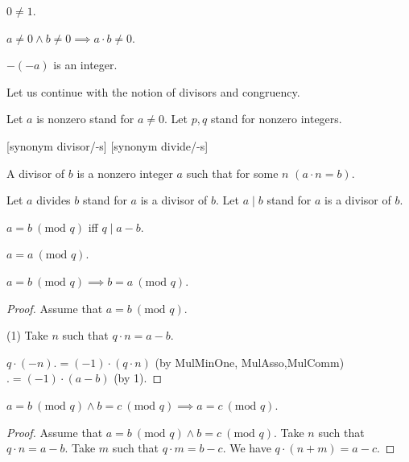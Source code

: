 \documentclass{article}
\renewcommand{\mod}{\text{mod }}
\begin{document}
  \begin{forthel}
    \begin{axiom}[NonTriv]
      $0 \neq 1$.
    \end{axiom}

    \begin{axiom}[ZeroDiv]
      $a \neq 0 \wedge b \neq 0 \implies a \cdot b \neq 0$.
    \end{axiom}

    \begin{lemma}
      $-(-a)$ is an integer.
    \end{lemma}
  \end{forthel}

  Let us continue with the notion of divisors and congruency.

  \begin{forthel}
    Let $a$ is nonzero stand for $a \neq 0$.
    Let $p,q$ stand for nonzero integers.

    [synonym divisor/-s] [synonym divide/-s]

    \begin{definition}[Divisor]
      A divisor of $b$ is a nonzero integer $a$ such that for some $n$ $(a \cdot n = b)$.
    \end{definition}

    Let $a$ divides $b$ stand for $a$ is a divisor of $b$.
    Let $a \mid b$ stand for $a$ is a divisor of $b$.

    \begin{definition}[EquMod]
      $a = b ~(\mod q)$ iff $q \mid a-b$.
    \end{definition}

    \begin{lemma}[EquModRef]
      $a = a ~(\mod q)$.
    \end{lemma}

    \begin{lemma}[EquModSym]
      $a = b ~(\mod q) \implies b = a ~(\mod q)$.
    \end{lemma}
    \begin{proof}
      Assume that $a = b ~(\mod q)$.

      (1) Take $n$ such that $q \cdot n = a - b$.

      $q \cdot (-n) .= (-1) \cdot (q \cdot n)$ (by MulMinOne, MulAsso,MulComm) $.= (-1) \cdot (a - b)$ (by 1).
    \end{proof}

    \begin{lemma}[EquModTrn]
      $a = b ~(\mod q) \wedge b = c ~(\mod q) \implies a = c ~(\mod q)$.
    \end{lemma}
    \begin{proof}
      Assume that $a = b ~(\mod q) \wedge b = c ~(\mod q)$. Take $n$ such that $q \cdot n = a - b$. Take $m$ such that $q \cdot m = b - c$. We have $q \cdot (n + m) = a - c$.
    \end{proof}


\end{forthel}
\end{document}
